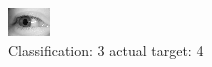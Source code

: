\begin{figure}[h!]
\begin{center}
\includegraphics[width=0.60\columnwidth]{figures/ID3117_class_3_target_4.png}
\end{center}
\caption{ Classification: 3 actual target: 4}
\label{fig:ID3117_class_3_target_4}
\end{figure}
